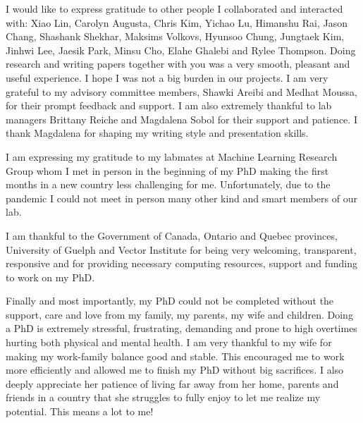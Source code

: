 I would like to express gratitude to other people I collaborated and interacted with: Xiao Lin, Carolyn Augusta, Chris Kim, Yichao Lu, Himanshu Rai, Jason Chang, Shashank Shekhar, Maksims Volkovs, Hyunsoo Chung, Jungtaek Kim, Jinhwi Lee, Jaesik Park, Minsu Cho, Elahe Ghalebi and Rylee Thompson. Doing research and writing papers together with you was a very smooth, pleasant and useful experience. I hope I was not a big burden in our projects. I am very grateful to my advisory committee members, Shawki Areibi and Medhat Moussa, for their prompt feedback and support. I am also extremely thankful to lab managers Brittany Reiche and Magdalena Sobol for their support and patience. I thank Magdalena for shaping my writing style and presentation skills.

I am expressing my gratitude to my labmates at Machine Learning Research Group whom I met in person in the beginning of my PhD making the first months in a new country less challenging for me.
Unfortunately, due to the pandemic I could not meet in person many other kind and smart members of our lab. 

I am thankful to the Government of Canada, Ontario and Quebec provinces, University of Guelph and Vector Institute for being very welcoming, transparent, responsive and for providing necessary computing resources, support and funding to work on my PhD.

Finally and most importantly, my PhD could not be completed without the support, care and love from my family, my parents, my wife and children. Doing a PhD is extremely stressful, frustrating, demanding and prone to high overtimes hurting both physical and mental health. I am very thankful to my wife for making my work-family balance good and stable. This encouraged me to work more efficiently and allowed me to finish my PhD without big sacrifices. I also deeply appreciate her patience of living far away from her home, parents and friends in a country that she struggles to fully enjoy to let me realize my potential. This means a lot to me! 
